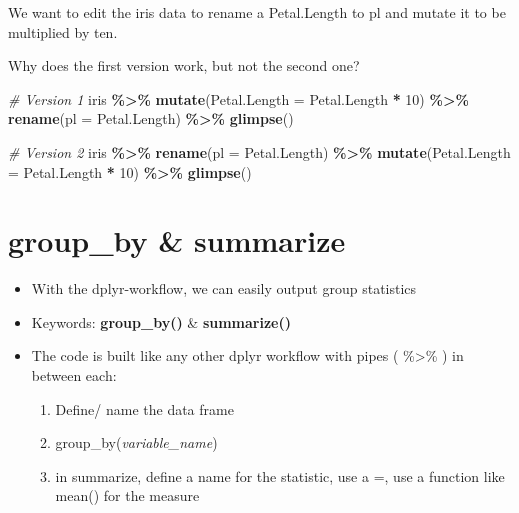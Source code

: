 \documentclass[
]{book}
\newenvironment{Shaded}{\begin{snugshade}}{\end{snugshade}}
\newcommand{\AttributeTok}[1]{\textcolor[rgb]{0.13,0.29,0.53}{#1}}
\newcommand{\CommentTok}[1]{\textcolor[rgb]{0.56,0.35,0.01}{\textit{#1}}}
\newcommand{\DecValTok}[1]{\textcolor[rgb]{0.00,0.00,0.81}{#1}}
\newcommand{\FunctionTok}[1]{\textcolor[rgb]{0.13,0.29,0.53}{\textbf{#1}}}
\newcommand{\NormalTok}[1]{#1}
\newcommand{\SpecialCharTok}[1]{\textcolor[rgb]{0.81,0.36,0.00}{\textbf{#1}}}
\providecommand{\tightlist}{%
  \setlength{\itemsep}{0pt}\setlength{\parskip}{0pt}}
\begin{document}
We want to edit the iris data to rename a Petal.Length to pl and mutate it to be multiplied by ten.

Why does the first version work, but not the second one?

\begin{Shaded}
\begin{Highlighting}[]
\CommentTok{\# Version 1}
\NormalTok{iris }\SpecialCharTok{\%\textgreater{}\%} 
  \FunctionTok{mutate}\NormalTok{(}\AttributeTok{Petal.Length =}\NormalTok{ Petal.Length }\SpecialCharTok{*} \DecValTok{10}\NormalTok{) }\SpecialCharTok{\%\textgreater{}\%} 
  \FunctionTok{rename}\NormalTok{(}\AttributeTok{pl =}\NormalTok{ Petal.Length) }\SpecialCharTok{\%\textgreater{}\%} 
  \FunctionTok{glimpse}\NormalTok{()}

\CommentTok{\# Version 2}
\NormalTok{iris }\SpecialCharTok{\%\textgreater{}\%} 
  \FunctionTok{rename}\NormalTok{(}\AttributeTok{pl =}\NormalTok{ Petal.Length) }\SpecialCharTok{\%\textgreater{}\%} 
  \FunctionTok{mutate}\NormalTok{(}\AttributeTok{Petal.Length =}\NormalTok{ Petal.Length }\SpecialCharTok{*} \DecValTok{10}\NormalTok{) }\SpecialCharTok{\%\textgreater{}\%} 
  \FunctionTok{glimpse}\NormalTok{()}
\end{Highlighting}
\end{Shaded}

\section{group\_by \& summarize}\label{group_by-summarize}

\begin{itemize}
\tightlist
\item
  With the dplyr-workflow, we can easily output group statistics
\item
  Keywords: \textbf{group\_by()} \& \textbf{summarize()}
\item
  The code is built like any other dplyr workflow with pipes ( \%\textgreater\% ) in between each:

  \begin{enumerate}
  \def\labelenumi{\arabic{enumi}.}
  \tightlist
  \item
    Define/ name the data frame
  \item
    group\_by(\emph{variable\_name})
  \item
    in summarize, define a name for the statistic, use a =, use a function like mean() for the measure
  \end{enumerate}
\end{itemize}
\end{document}
